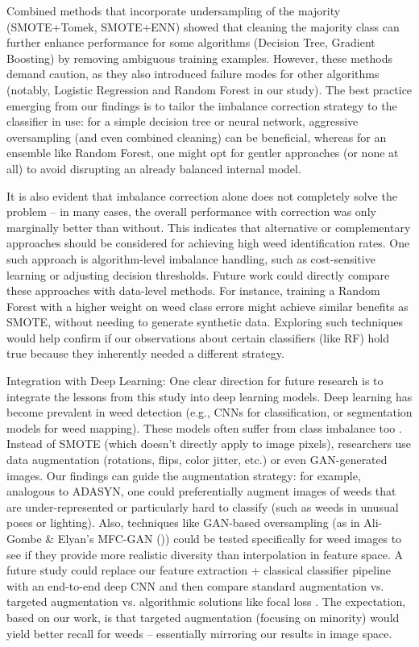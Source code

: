 \documentclass[agriengineering,article,submit,pdftex,moreauthors]{Definitions/mdpi}
\begin{document}
Combined methods that incorporate undersampling of the majority (SMOTE+Tomek, SMOTE+ENN) showed that cleaning the majority class can further enhance performance for some algorithms (Decision Tree, Gradient Boosting) by removing ambiguous training examples. However, these methods demand caution, as they also introduced failure modes for other algorithms (notably, Logistic Regression and Random Forest in our study). The best practice emerging from our findings is to tailor the imbalance correction strategy to the classifier in use: for a simple decision tree or neural network, aggressive oversampling (and even combined cleaning) can be beneficial, whereas for an ensemble like Random Forest, one might opt for gentler approaches (or none at all) to avoid disrupting an already balanced internal model.

It is also evident that imbalance correction alone does not completely solve the problem – in many cases, the overall performance with correction was only marginally better than without. This indicates that alternative or complementary approaches should be considered for achieving high weed identification rates. One such approach is algorithm-level imbalance handling, such as cost-sensitive learning or adjusting decision thresholds. Future work could directly compare these approaches with data-level methods. For instance, training a Random Forest with a higher weight on weed class errors might achieve similar benefits as SMOTE, without needing to generate synthetic data. Exploring such techniques would help confirm if our observations about certain classifiers (like RF) hold true because they inherently needed a different strategy.

Integration with Deep Learning: One clear direction for future research is to integrate the lessons from this study into deep learning models. Deep learning has become prevalent in weed detection (e.g., CNNs for classification, or segmentation models for weed mapping). These models often suffer from class imbalance too \cite{Nasiri2022-rj}. Instead of SMOTE (which doesn’t directly apply to image pixels), researchers use data augmentation (rotations, flips, color jitter, etc.) or even GAN-generated images. Our findings can guide the augmentation strategy: for example, analogous to ADASYN, one could preferentially augment images of weeds that are under-represented or particularly hard to classify (such as weeds in unusual poses or lighting). Also, techniques like GAN-based oversampling (as in Ali-Gombe \& Elyan’s MFC-GAN (\cite{Ali-Gombe2019-kr})) could be tested specifically for weed images to see if they provide more realistic diversity than interpolation in feature space. A future study could replace our feature extraction + classical classifier pipeline with an end-to-end deep CNN and then compare standard augmentation vs. targeted augmentation vs. algorithmic solutions like focal loss \cite{Brems2025-yg}. The expectation, based on our work, is that targeted augmentation (focusing on minority) would yield better recall for weeds – essentially mirroring our results in image space.
\end{document}
